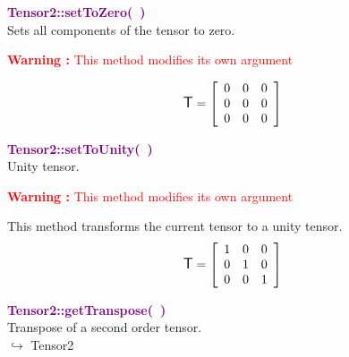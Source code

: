 \textcolor{purple}{\textbf{Tensor2::setToZero(~)}}\label{Tensor2::setToZero()}\\
Sets all components of the tensor to zero.

\hspace*{10mm}\textcolor{red}{\textbf{Warning :} This method modifies its own argument}

\begin{equation*}
\mbox{\large\ensuremath{\mathsf{T}}}=\left[\begin{array}{ccc}
0&0&0\\
0&0&0\\
0&0&0
\end{array}\right]
\end{equation*}

\textcolor{purple}{\textbf{Tensor2::setToUnity(~)}}\label{Tensor2::setToUnity()}\\
Unity tensor.

\hspace*{10mm}\textcolor{red}{\textbf{Warning :} This method modifies its own argument}

This method transforms the current tensor to a unity tensor.
\begin{equation*}
\mbox{\large\ensuremath{\mathsf{T}}}=\left[\begin{array}{ccc}
1&0&0\\
0&1&0\\
0&0&1
\end{array}\right]
\end{equation*}

\textcolor{purple}{\textbf{Tensor2::getTranspose(~)}}\label{Tensor2::getTranspose()}\\
Transpose of a second order tensor.\\ \hspace*{10mm}$\hookrightarrow$ Tensor2

